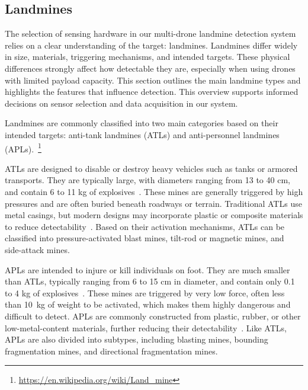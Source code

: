 \subsection{Landmines} \label{landmines}

The selection of sensing hardware in our multi-drone landmine detection system relies on a clear understanding of the target: landmines. Landmines differ widely in size, materials, triggering mechanisms, and intended targets. These physical differences strongly affect how detectable they are, especially when using drones with limited payload capacity. This section outlines the main landmine types and highlights the features that influence detection. This overview supports informed decisions on sensor selection and data acquisition in our system.

Landmines are commonly classified into two main categories based on their intended targets: anti-tank landmines (ATLs) and anti-personnel landmines (APLs).~\footnote{\url{https://en.wikipedia.org/wiki/Land_mine}}

ATLs are designed to disable or destroy heavy vehicles such as tanks or armored transports. They are typically large, with diameters ranging from 13 to 40 cm, and contain 6 to 11 kg of explosives~\cite{paik2002image}. These mines are generally triggered by high pressures and are often buried beneath roadways or terrain. Traditional ATLs use metal casings, but modern designs may incorporate plastic or composite materials to reduce detectability~\cite{evans2024detection}. Based on their activation mechanisms, ATLs can be classified into pressure-activated blast mines, tilt-rod or magnetic mines, and side-attack mines.

APLs are intended to injure or kill individuals on foot. They are much smaller than ATLs, typically ranging from 6 to 15 cm in diameter, and contain only 0.1 to 4 kg of explosives~\cite{paik2002image}. These mines are triggered by very low force, often less than 10~kg of weight to be activated, which makes them highly dangerous and difficult to detect. APLs are commonly constructed from plastic, rubber, or other low-metal-content materials, further reducing their detectability~\cite{kaya2017buried}. Like ATLs, APLs are also divided into subtypes, including blasting mines, bounding fragmentation mines, and directional fragmentation mines.

